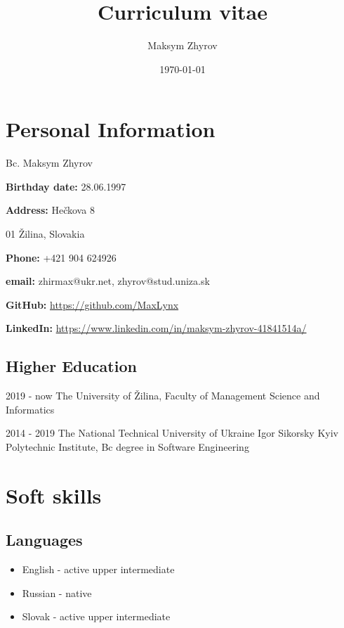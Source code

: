 \documentclass[a4paper,12pt]{article}
\author{Maksym Zhyrov}
\title{Curriculum vitae}
\date{\today}
\begin{document}
\section*{Personal Information}


{\Large Bc. Maksym Zhyrov}

\bigskip

\textbf{Birthday date:} 28.06.1997

\smallskip

\textbf{Address:} 
Hečkova 8

\smallskip
\quad \quad \quad \quad {} 01 Žilina, 
Slovakia

\smallskip

\textbf{Phone:} +421 904 624926

\smallskip

\textbf{email:} 
zhirmax@ukr.net, 
zhyrov@stud.uniza.sk 

\smallskip

\textbf{GitHub:} \url{https://github.com/MaxLynx}

\smallskip

\textbf{LinkedIn:} \url{https://www.linkedin.com/in/maksym-zhyrov-41841514a/}

\subsection*{Higher Education}

2019 - now The University of Žilina,
Faculty of Management Science and Informatics

2014 - 2019 The National Technical University of Ukraine 
Igor Sikorsky Kyiv Polytechnic Institute,
Bc degree in Software Engineering

\section*{Soft skills}

\subsection*{Languages}

\begin{itemize}
    \item English - active upper intermediate
    \item Russian - native
    \item Slovak - active upper intermediate
\end{itemize}
\end{document}
